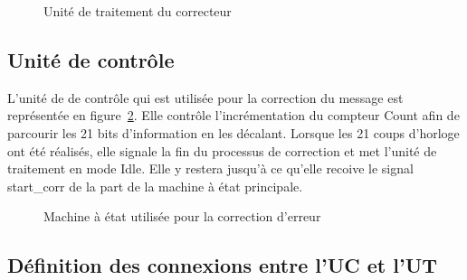 \documentclass[a4paper, 11pt, svgnames]{report}
\begin{document}
\begin{figure}[H]
                \caption{Unité de traitement du correcteur}
                \label{fig:ut_corr}
            \end{figure}

            \subsection{Unité de contrôle}
                L'unité de de contrôle qui est utilisée pour la correction du 
                message est représentée en figure~\ref{fig:uc_corr}.
                Elle contrôle l'incrémentation du compteur Count afin de 
                parcourir les 21 bits d'information en les décalant. 
                Lorsque les 21 coups d'horloge ont été réalisés, elle signale
                la fin du processus de correction et met l'unité de traitement
                en mode Idle. Elle y restera jusqu'à ce qu'elle recoive le 
                signal start\_corr de la part de la machine à état principale.
            \begin{figure}[H]
                \centering
                \caption{Machine à état utilisée pour la correction d'erreur}
                \label{fig:uc_corr}
            \end{figure}

            \subsection{Définition des connexions entre l'UC et l'UT}
\end{document}
